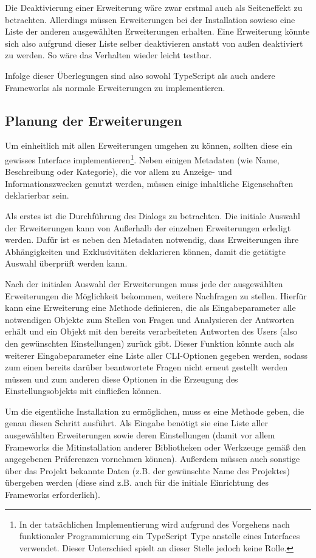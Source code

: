 Die Deaktivierung einer Erweiterung wäre zwar erstmal auch als Seiteneffekt zu betrachten. Allerdings müssen Erweiterungen bei der Installation sowieso eine Liste der anderen ausgewählten Erweiterungen erhalten. Eine Erweiterung könnte sich also aufgrund dieser Liste selber deaktivieren anstatt von außen deaktiviert zu werden. So wäre das Verhalten wieder leicht testbar.

Infolge dieser Überlegungen sind also sowohl TypeScript als auch andere Frameworks als normale Erweiterungen zu implementieren.

\subsection{Planung der Erweiterungen}
Um einheitlich mit allen Erweiterungen umgehen zu können, sollten diese ein gewisses Interface implementieren\footnote{In der tatsächlichen Implementierung wird aufgrund des Vorgehens nach funktionaler Programmierung ein TypeScript Type anstelle eines Interfaces verwendet. Dieser Unterschied spielt an dieser Stelle jedoch keine Rolle.}. Neben einigen Metadaten (wie Name, Beschreibung oder Kategorie), die vor allem zu Anzeige- und Informationszwecken genutzt werden, müssen einige inhaltliche Eigenschaften deklarierbar sein.

Als erstes ist die Durchführung des Dialogs zu betrachten. Die initiale Auswahl der Erweiterungen kann von Außerhalb der einzelnen Erweiterungen erledigt werden. Dafür ist es neben den Metadaten notwendig, dass Erweiterungen ihre Abhängigkeiten und Exklusivitäten deklarieren können, damit die getätigte Auswahl überprüft werden kann.

Nach der initialen Auswahl der Erweiterungen muss jede der ausgewählten Erweiterungen die Möglichkeit bekommen, weitere Nachfragen zu stellen. Hierfür kann eine Erweiterung eine Methode definieren, die als Eingabeparameter alle notwendigen Objekte zum Stellen von Fragen und Analysieren der Antworten erhält und ein Objekt mit den bereits verarbeiteten Antworten des Users (also den gewünschten Einstellungen) zurück gibt. Dieser Funktion könnte auch als weiterer Eingabeparameter eine Liste aller \gls{CLI}-Optionen gegeben werden, sodass zum einen bereits darüber beantwortete Fragen nicht erneut gestellt werden müssen und zum anderen diese Optionen in die Erzeugung des Einstellungsobjekts mit einfließen können.

Um die eigentliche Installation zu ermöglichen, muss es eine Methode geben, die genau diesen Schritt ausführt. Als Eingabe benötigt sie eine Liste aller ausgewählten Erweiterungen sowie deren Einstellungen (damit vor allem Frameworks die Mitinstallation anderer Bibliotheken oder Werkzeuge gemäß den angegebenen Präferenzen vornehmen können). Außerdem müssen auch sonstige über das Projekt bekannte Daten (z.B. der gewünschte Name des Projektes) übergeben werden (diese sind z.B. auch für die initiale Einrichtung des Frameworks erforderlich).


